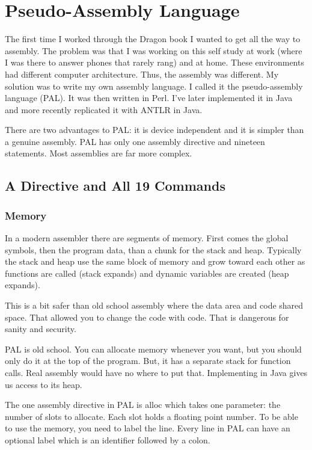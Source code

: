 \chapter{Pseudo-Assembly Language}

The first time I worked through the Dragon book I wanted to get
all the way to assembly. The problem was that I was working on this
self study at work (where I was there to answer phones that rarely
rang) and at home. These environments had different computer architecture.
Thus, the assembly was different. My solution was to write my own
assembly language. I called it the pseudo-assembly language (PAL).
It was then written in Perl. I've later implemented it in Java
and more recently replicated it with ANTLR in Java.

There are two advantages to PAL: it is device independent and it is
simpler than a genuine assembly. PAL has only one assembly directive
and nineteen statements. Most assemblies are far more complex.

\section{A Directive and All 19 Commands}

\subsection{Memory}

In a modern assembler there are segments of memory. First comes
the global symbols, then the program data, than a chunk for
the stack and heap. Typically the stack and heap use the same
block of memory and grow toward each other as functions are called
(stack expands) and dynamic variables are created (heap expands).

This is a bit safer than old school assembly where the data area
and code shared space. That allowed you to change the code with
code. That is dangerous for sanity and security.

PAL is old school. You can allocate memory whenever you want, but
you should only do it at the top of the program. But, it has
a separate stack for function calls. Real assembly would have
no where to put that. Implementing in Java gives us access to its heap.

The one assembly directive in PAL is alloc which takes one parameter:
the number of slots to allocate. Each slot holds a floating point
number. To be able to use the memory, you need to label the line.
Every line in PAL can have an optional label which is an identifier
followed by a colon.

